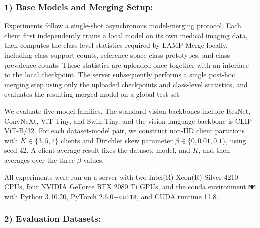 \documentclass[letterpaper]{article} %
\begin{document}
\subsubsection{1) Base Models and Merging Setup:} 
Experiments follow a single-shot asynchronous model-merging protocol. Each client first independently trains a local model on its own medical imaging data, then computes the class-level statistics required by LAMP-Merge locally, including class-support counts, reference-space class prototypes, and class-prevalence counts. These statistics are uploaded once together with an interface to the local checkpoint. The server subsequently performs a single post-hoc merging step using only the uploaded checkpoints and class-level statistics, and evaluates the resulting merged model on a global test set.

We evaluate five model families. The standard vision backbones include ResNet, ConvNeXt, ViT-Tiny, and Swin-Tiny, and the vision-language backbone is CLIP-ViT-B/32. For each dataset-model pair, we construct non-IID client partitions with $K\in\{3,5,7\}$ clients and Dirichlet skew parameter $\beta\in\{0,0.01,0.1\}$, using seed 42. A client-average result fixes the dataset, model, and $K$, and then averages over the three $\beta$ values.

All experiments were run on a server with two Intel(R) Xeon(R) Silver 4210 CPUs, four NVIDIA GeForce RTX 2080 Ti GPUs, and the conda environment \texttt{MM} with Python 3.10.20, PyTorch 2.6.0+\texttt{cu118}, and CUDA runtime 11.8.

\subsubsection{2) Evaluation Datasets:}
\end{document}
